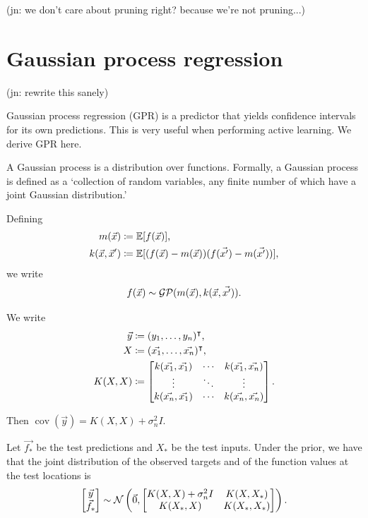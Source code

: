 \documentclass[11pt,twoside,openright]{report}
\newcommand\bbE{\mathbb{E}}
\newcommand\cG{\mathcal{G}}
\newcommand\cN{\mathcal{N}}
\newcommand\cP{\mathcal{P}}
\DeclareMathOperator{\cov}{cov}
\newcommand\jn[1]{{\color{red}(jn: #1)}}
\begin{document}
\jn{we don't care about pruning right? because we're not pruning...}

\section{Gaussian process regression}
\jn{rewrite this sanely}

Gaussian process regression (GPR) is a predictor that yields confidence intervals for its own predictions. This is very useful when performing active learning. We derive GPR here.

A Gaussian process is a distribution over functions. Formally, a Gaussian process is defined as a `collection of random variables, any finite number of which have a joint Gaussian distribution.'\citep{GPBook}

Defining \begin{align*}
    m(\vec{x}) &\coloneqq \bbE[f(\vec{x})] \text, \\
    k(\vec{x}, \vec{x}') &\coloneqq \bbE[(f(\vec{x}) - m(\vec{x}))(f(\vec{x'}) - m(\vec{x'}))],
\end{align*} we write \[
    f(\vec{x}) \sim \cG\cP(m(\vec{x}), k(\vec{x}, \vec{x'}))\text.
\]

We write \begin{align*}
    \vec y &\coloneqq (y_1, \dots, y_n)^\intercal \text, \\
    X &\coloneqq (\vec{x_1}, \dots, \vec{x_n})^\intercal \text, \\
    K(X, X) &\coloneqq \begin{bmatrix}
        k(\vec{x_1}, \vec{x_1}) & \cdots & k(\vec{x_1}, \vec{x_n}) \\
        \vdots & \ddots & \vdots \\
        k(\vec{x_n}, \vec{x_1}) & \cdots & k(\vec{x_n}, \vec{x_n})
    \end{bmatrix}\text.
\end{align*}

Then $\cov(\vec{y}) = K(X, X) + \sigma_n^2I$.

Let $\vec{f_*}$ be the test predictions and $X_*$ be the test inputs. Under the prior, we have that the joint distribution of the observed targets and of the function values at the test locations is \[
    \begin{bmatrix}
        \vec{y} \\ \vec{f_*}
    \end{bmatrix} \sim \cN\left(\vec0, \begin{bmatrix}
        K(X, X) + \sigma_n^2I & K(X, X_*) \\
        K(X_*, X) & K(X_*, X_*)
    \end{bmatrix}\right)\text.
\]
\end{document}

